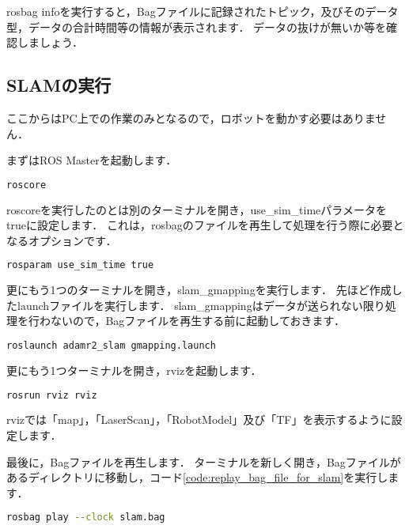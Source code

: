 \documentclass[{../../master}]{subfiles}
\begin{document}
\textsf{rosbag info}を実行すると，Bagファイルに記録されたトピック，及びそのデータ型，データの合計時間等の情報が表示されます．
データの抜けが無いか等を確認しましょう．

\subsection{SLAMの実行}

ここからはPC上での作業のみとなるので，ロボットを動かす必要はありません．

まずはROS Masterを起動します．

\begin{lstlisting}[language=sh, caption=Execute \textsf{roscore}]
roscore
\end{lstlisting}

\textsf{roscore}を実行したのとは別のターミナルを開き，\textsf{use\_sim\_time}パラメータをtrueに設定します．
これは，\textsf{rosbag}のファイルを再生して処理を行う際に必要となるオプションです．

\begin{lstlisting}[language=sh, caption=Set \textsf{use\_sim\_time} to true]
rosparam use_sim_time true
\end{lstlisting}

更にもう1つのターミナルを開き，\textsf{slam\_gmapping}を実行します．
先ほど作成したlaunchファイルを実行します．
\textsf{slam\_gmapping}はデータが送られない限り処理を行わないので，Bagファイルを再生する前に起動しておきます．

\begin{lstlisting}[language=sh, caption=Run \textsf{gmapping.launch}]
roslaunch adamr2_slam gmapping.launch
\end{lstlisting}

更にもう1つターミナルを開き，\textsf{rviz}を起動します．

\begin{lstlisting}[language=sh, caption=Run \textsf{rviz}]
rosrun rviz rviz
\end{lstlisting}

\textsf{rviz}では「map」，「LaserScan」，「RobotModel」及び「TF」を表示するように設定します．

最後に，Bagファイルを再生します．
ターミナルを新しく開き，Bagファイルがあるディレクトリに移動し，コード\ref{code:replay_bag_file_for_slam}を実行します．

\begin{lstlisting}[language=sh, label=code:replay_bag_file_for_slam, caption=Replay \textsf{slam.bag}]
rosbag play --clock slam.bag
\end{lstlisting}
\end{document}
